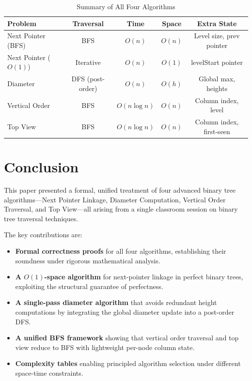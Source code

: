 \documentclass[10pt,journal,compsoc,onecolumn]{IEEEtran}
\begin{document}
\begin{table}[h]
\centering
\caption{Summary of All Four Algorithms}
\begin{tabular}{lcccc}
\toprule
\textbf{Problem} & \textbf{Traversal} & \textbf{Time} & \textbf{Space} & \textbf{Extra State} \\
\midrule
Next Pointer (BFS) & BFS & $O(n)$ & $O(n)$ & Level size, prev pointer \\
Next Pointer ($O(1)$) & Iterative & $O(n)$ & $O(1)$ & levelStart pointer \\
Diameter & DFS (post-order) & $O(n)$ & $O(h)$ & Global max, heights \\
Vertical Order & BFS & $O(n \log n)$ & $O(n)$ & Column index, level \\
Top View & BFS & $O(n \log n)$ & $O(n)$ & Column index, first-seen \\
\bottomrule
\end{tabular}
\end{table}

\section{Conclusion}
\label{sec:conclusion}

This paper presented a formal, unified treatment of four advanced binary tree algorithms---Next Pointer Linkage, Diameter Computation, Vertical Order Traversal, and Top View---all arising from a single classroom session on binary tree traversal techniques.

The key contributions are:

\begin{itemize}
    \item \textbf{Formal correctness proofs} for all four algorithms, establishing their soundness under rigorous mathematical analysis.
    \item \textbf{A $O(1)$-space algorithm} for next-pointer linkage in perfect binary trees, exploiting the structural guarantee of perfectness.
    \item \textbf{A single-pass diameter algorithm} that avoids redundant height computations by integrating the global diameter update into a post-order DFS.
    \item \textbf{A unified BFS framework} showing that vertical order traversal and top view reduce to BFS with lightweight per-node column state.
    \item \textbf{Complexity tables} enabling principled algorithm selection under different space-time constraints.
\end{itemize}
\end{document}
